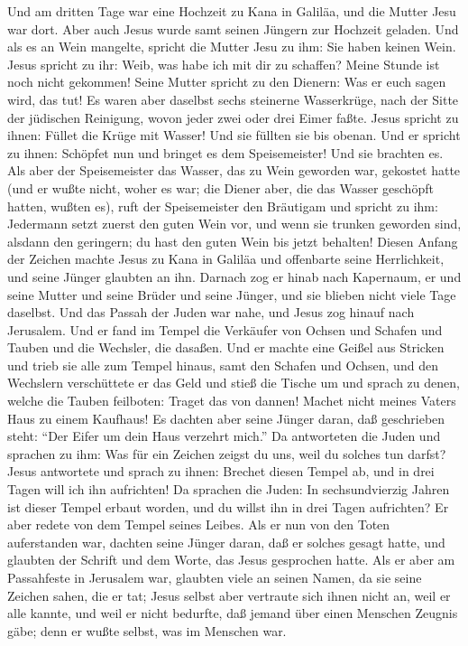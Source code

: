  Und am dritten Tage war eine Hochzeit zu Kana in Galiläa,
und die Mutter Jesu war dort.  Aber auch Jesus wurde samt
seinen Jüngern zur Hochzeit geladen.  Und als es an Wein
mangelte, spricht die Mutter Jesu zu ihm: Sie haben keinen Wein.
 Jesus spricht zu ihr: Weib, was habe ich mit dir zu
schaffen? Meine Stunde ist noch nicht gekommen!  Seine
Mutter spricht zu den Dienern: Was er euch sagen wird, das tut!
 Es waren aber daselbst sechs steinerne Wasserkrüge, nach
der Sitte der jüdischen Reinigung, wovon jeder zwei oder drei Eimer
faßte.  Jesus spricht zu ihnen: Füllet die Krüge mit
Wasser! Und sie füllten sie bis obenan.  Und er spricht zu
ihnen: Schöpfet nun und bringet es dem Speisemeister! Und sie brachten
es.  Als aber der Speisemeister das Wasser, das zu Wein
geworden war, gekostet hatte (und er wußte nicht, woher es war; die
Diener aber, die das Wasser geschöpft hatten, wußten es), ruft der
Speisemeister den Bräutigam  und spricht zu ihm:
Jedermann setzt zuerst den guten Wein vor, und wenn sie trunken geworden
sind, alsdann den geringern; du hast den guten Wein bis jetzt behalten!
 Diesen Anfang der Zeichen machte Jesus zu Kana in
Galiläa und offenbarte seine Herrlichkeit, und seine Jünger glaubten an
ihn.  Darnach zog er hinab nach Kapernaum, er und seine
Mutter und seine Brüder und seine Jünger, und sie blieben nicht viele
Tage daselbst.  Und das Passah der Juden war nahe, und
Jesus zog hinauf nach Jerusalem.  Und er fand im Tempel
die Verkäufer von Ochsen und Schafen und Tauben und die Wechsler, die
dasaßen.  Und er machte eine Geißel aus Stricken und
trieb sie alle zum Tempel hinaus, samt den Schafen und Ochsen, und den
Wechslern verschüttete er das Geld und stieß die Tische um
 und sprach zu denen, welche die Tauben feilboten: Traget
das von dannen! Machet nicht meines Vaters Haus zu einem Kaufhaus!
 Es dachten aber seine Jünger daran, daß geschrieben
steht: ``Der Eifer um dein Haus verzehrt mich.''  Da
antworteten die Juden und sprachen zu ihm: Was für ein Zeichen zeigst du
uns, weil du solches tun darfst?  Jesus antwortete und
sprach zu ihnen: Brechet diesen Tempel ab, und in drei Tagen will ich
ihn aufrichten!  Da sprachen die Juden: In
sechsundvierzig Jahren ist dieser Tempel erbaut worden, und du willst
ihn in drei Tagen aufrichten?  Er aber redete von dem
Tempel seines Leibes.  Als er nun von den Toten
auferstanden war, dachten seine Jünger daran, daß er solches gesagt
hatte, und glaubten der Schrift und dem Worte, das Jesus gesprochen
hatte.  Als er aber am Passahfeste in Jerusalem war,
glaubten viele an seinen Namen, da sie seine Zeichen sahen, die er tat;
 Jesus selbst aber vertraute sich ihnen nicht an, weil er
alle kannte,  und weil er nicht bedurfte, daß jemand über
einen Menschen Zeugnis gäbe; denn er wußte selbst, was im Menschen war.

